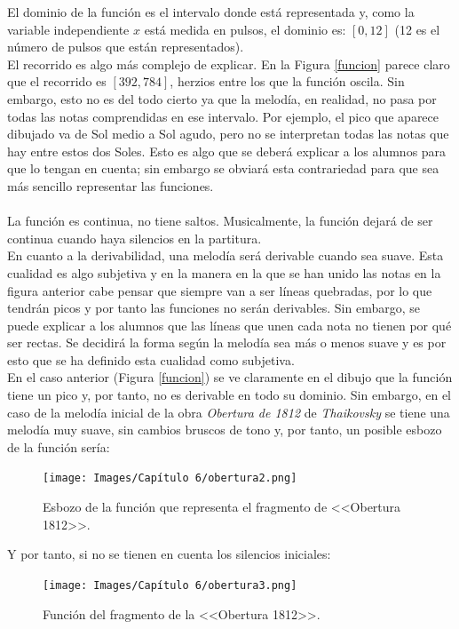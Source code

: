 \documentclass[a4paper, openright, 11pt, titlepage]{report}
\theoremstyle{definition}\newtheorem{defin}[propo]{Definition}
\theoremstyle{definition}\newtheorem{obser}[propo]{Remark}
\theoremstyle{definition}\newtheorem{ejem}[propo]{Ejemplo}
\theoremstyle{definition}\newtheorem{algoritmo}[propo]{Algoritmo}
\begin{document}
El dominio de la función es el intervalo donde está representada y, como la variable independiente $x$ está medida en pulsos, el dominio es: $[0, 12]$ (12 es el número de pulsos que están representados).\\
El recorrido es algo más complejo de explicar. En la Figura \ref{funcion} parece claro que el recorrido es $[392, 784]$, herzios entre los que la función oscila. Sin embargo, esto no es del todo cierto ya que la melodía, en realidad, no pasa por todas las notas comprendidas en ese intervalo. Por ejemplo, el pico que aparece dibujado va de Sol medio a Sol agudo, pero no se interpretan todas las notas que hay entre estos dos Soles. Esto es algo que se deberá explicar a los alumnos para que lo tengan en cuenta; sin embargo se obviará esta contrariedad para que sea más sencillo representar las funciones.\\\\
La función es continua, no tiene saltos. Musicalmente, la función dejará de ser continua cuando haya silencios en la partitura.\\
En cuanto a la derivabilidad, una melodía será derivable cuando sea suave. Esta cualidad es algo subjetiva y en la manera en la que se han unido las notas en la figura anterior cabe pensar que siempre van a ser líneas quebradas, por lo que tendrán picos y por tanto las funciones no serán derivables. Sin embargo, se puede explicar a los alumnos que las líneas que unen cada nota no tienen por qué ser rectas. Se decidirá la forma según la melodía sea más o menos suave y es por esto que se ha definido esta cualidad como subjetiva.\\
En el caso anterior (Figura \ref{funcion}) se ve claramente en el dibujo que la función tiene un pico y, por tanto, no es derivable en todo su dominio. Sin embargo, en el caso de la melodía inicial de la obra \textit{Obertura de 1812} de \textit{Thaikovsky} se tiene una melodía muy suave, sin cambios bruscos de tono y, por tanto, un posible esbozo de la función sería:
\begin{figure}[H]
    \centering
    \texttt{[image: Images/Capítulo 6/obertura2.png]}
    \caption{Esbozo de la función que representa el fragmento de <<Obertura 1812>>.}
\end{figure}
Y por tanto, si no se tienen en cuenta los silencios iniciales:
\begin{figure}[H]
    \centering
    \texttt{[image: Images/Capítulo 6/obertura3.png]}
    \caption{Función del fragmento de la <<Obertura 1812>>.}
\end{figure}
\end{document}
